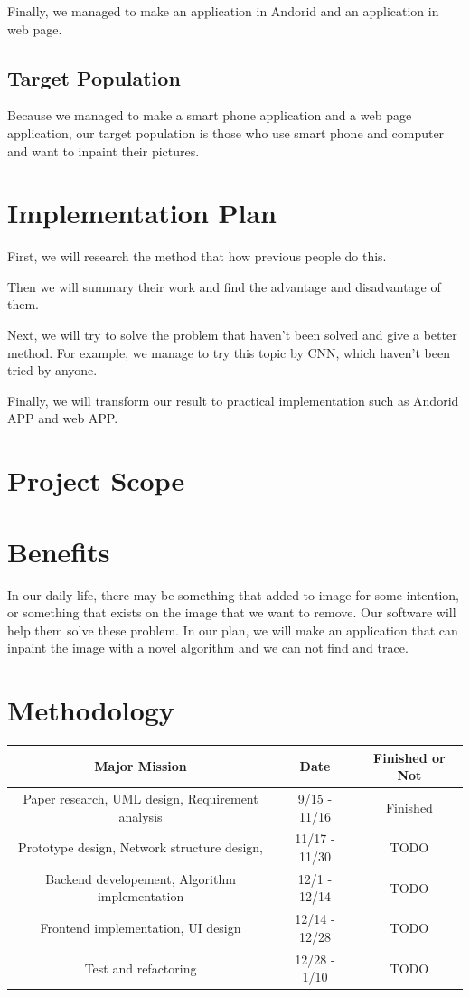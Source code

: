 \documentclass[12pt]{article}
\begin{document}
\qquad Finally, we managed to make an application in Andorid and an application in web page.
\subsection{Target Population}
\qquad Because we managed to make a smart phone application and a web page application, our target population is those who use smart phone and computer and want to inpaint their pictures.
\section{Implementation Plan}
\qquad First, we will research the method that how previous people do this. 

\qquad Then we will summary their work and find the advantage and disadvantage of them. 

\qquad Next, we will try to solve the problem that haven't been solved and give a better method. For example, we manage to try this topic by CNN, which haven't been tried by anyone. 

\qquad Finally, we will transform our result to practical implementation such as Andorid APP and web APP.



\section{Project Scope}



\section{Benefits}
\qquad In our daily life, there may be something that added to image for some intention, or something that exists on the image that we want to remove. Our software will help them solve these problem. In our plan, we will make an application that can inpaint the image with a novel algorithm and we can not find and trace. 
\section{Methodology}
\begin{table}[H]
	\centering
	\begin{tabular}{|c|c|c|}
		\hline
		Major Mission & Date & Finished or Not \\
		\hline
		Paper research, UML design, Requirement analysis
		& 9/15 - 11/16& Finished \\
		\hline
		 Prototype design, Network structure design, 
		 & 11/17 - 11/30 & TODO \\
		\hline
		 Backend developement, Algorithm implementation & 12/1 - 12/14 & TODO\\
		\hline
		 Frontend implementation, UI design & 12/14 - 12/28 & TODO\\
		\hline
		 Test and refactoring & 12/28 - 1/10 & TODO\\
		\hline 
		
	\end{tabular}
\end{table}
\end{document}
